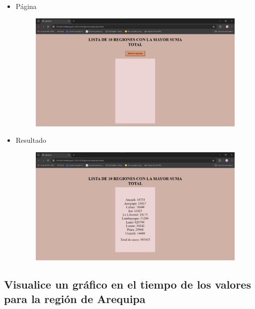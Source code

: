 \documentclass{article}
\begin{document}
\begin{itemize}
\begin{figure}[H]
		\end{figure}
		\item Página
		\begin{figure}[H]
			\centering
			\includegraphics[width=1.0\textwidth,keepaspectratio]{img/Ejer3T2Pagina.jpg}
		\end{figure}
		\item Resultado
		\begin{figure}[H]
			\centering
			\includegraphics[width=1.0\textwidth,keepaspectratio]{img/Ejer3T2Result.jpg}
		\end{figure}
	\end{itemize}

	\subsection{Visualice un gráfico en el tiempo de los valores para la región de Arequipa}
	
\end{document}
